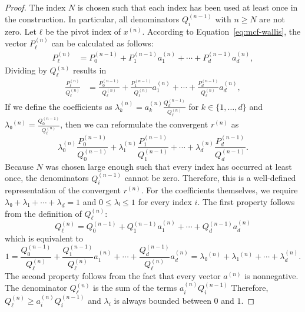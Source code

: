 \begin{proof}
  The index $N$ is chosen such that each index has been used at least once in the construction.
  In particular, all denominators $Q_i^{(n-1)}$ with $n ≥ N$ are not zero.
  Let $ℓ$ be the pivot index of $x^{(n)}$.
  According to Equation~\ref{eq:mcf-wallis}, the vector $P_ℓ^{(n)}$ can be calculated as follows:
  \begin{align*}
    P_ℓ^{(n)} & = P_0^{(n-1)} + P_1^{(n-1)} a_1^{(n)} + ⋯ + P_d^{(n-1)} a_d^{(n)},
  \end{align*}
  Dividing by $Q_ℓ^{(n)}$ results in
  \begin{align*}
    \frac{P_ℓ^{(n)}}{Q_ℓ^{(n)}}
    & = \frac{P_0^{(n-1)}}{Q_ℓ^{(n)}}
      + \frac{P_1^{(n-1)}}{Q_ℓ^{(n)}} a_1^{(n)}
      + ⋯
      + \frac{P_d^{(n-1)}}{Q_ℓ^{(n)}} a_d^{(n)},
  \end{align*}
  If we define the coefficients as $λ_k^{(n)} = a_k^{(n)} \frac{Q_k^{(n-1)}}{Q_ℓ^{(n)}}$ for $k ∈ \{1, …, d\}$
  and $λ₀^{(n)} = \frac{Q_0^{(n-1)}}{Q_ℓ^{(n)}}$,
  then we can reformulate the convergent $r^{(n)}$ as
  \[
      λ_0^{(n)} \frac{P_0^{(n-1)}}{Q_0^{(n-1)}}
    + λ_1^{(n)} \frac{P_1^{(n-1)}}{Q_1^{(n-1)}}
    + ⋯
    + λ_d^{(n)} \frac{P_d^{(n-1)}}{Q_d^{(n-1)}}.
  \]
  Because $N$ was chosen large enough such that every index has occurred at least once,
  the denominators $Q_i^{(n-1)}$ cannot be zero.
  Therefore, this is a well-defined representation of the convergent $r^{(n)}$.
  For the coefficients themselves, we require $λ₀ + λ₁ + ⋯ + λ_d = 1$ and $0 ≤ λᵢ ≤ 1$ for every index $i$.
  The first property follows from the definition of $Q_ℓ^{(n)}$:
  \[
    Q_ℓ^{(n)} = Q_0^{(n-1)} + Q_1^{(n-1)} a_1^{(n)} + ⋯ + Q_d^{(n-1)} a_d^{(n)}
  \]
  which is equivalent to
  \[
    1 = \frac{Q_0^{(n-1)}}{Q_ℓ^{(n)}} + \frac{Q_1^{(n-1)}}{Q_ℓ^{(n)}} a_1^{(n)} + ⋯ + \frac{Q_d^{(n-1)}}{Q_ℓ^{(n)}} a_d^{(n)} = λ₀^{(n)} + λ₁^{(n)} + ⋯ + λ_d^{(n)}.
  \]
  The second property follows from the fact that every vector $a^{(n)}$ is nonnegative.
  The denominator $Q_ℓ^{(n)}$ is the sum of the terms $a_i^{(n)} Q_i^{(n-1)}$
  Therefore, $Q_ℓ^{(n)} ≥ a_i^{(n)} Q_i^{(n-1)}$ and $λ_i$ is always bounded between $0$ and $1$.
\end{proof}

